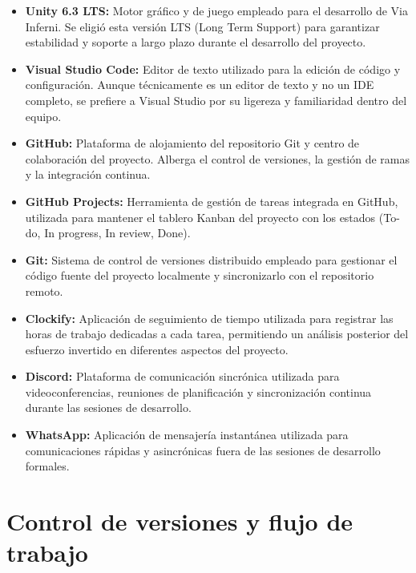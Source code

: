 \begin{itemize}
    \item \textbf{Unity 6.3 LTS:} Motor gráfico y de juego empleado para el desarrollo 
    de Via Inferni. Se eligió esta versión LTS (Long Term Support) para garantizar 
    estabilidad y soporte a largo plazo durante el desarrollo del proyecto.
    
    \item \textbf{Visual Studio Code:} Editor de texto utilizado para la edición de código 
    y configuración. Aunque técnicamente es un editor de texto y no un IDE completo, 
    se prefiere a Visual Studio por su ligereza y familiaridad dentro del equipo.
    
    \item \textbf{GitHub:} Plataforma de alojamiento del repositorio Git y centro 
    de colaboración del proyecto. Alberga el control de versiones, la gestión de 
    ramas y la integración continua.
    
    \item \textbf{GitHub Projects:} Herramienta de gestión de tareas integrada en GitHub, 
    utilizada para mantener el tablero Kanban del proyecto con los estados 
    (To-do, In progress, In review, Done).
    
    \item \textbf{Git:} Sistema de control de versiones distribuido empleado para 
    gestionar el código fuente del proyecto localmente y sincronizarlo con el repositorio 
    remoto.
    
    \item \textbf{Clockify:} Aplicación de seguimiento de tiempo utilizada para registrar 
    las horas de trabajo dedicadas a cada tarea, permitiendo un análisis posterior del 
    esfuerzo invertido en diferentes aspectos del proyecto.
    
    \item \textbf{Discord:} Plataforma de comunicación sincrónica utilizada para 
    videoconferencias, reuniones de planificación y sincronización continua durante 
    las sesiones de desarrollo.
    
    \item \textbf{WhatsApp:} Aplicación de mensajería instantánea utilizada para 
    comunicaciones rápidas y asincrónicas fuera de las sesiones de desarrollo formales.
\end{itemize}

\section{Control de versiones y flujo de trabajo}

